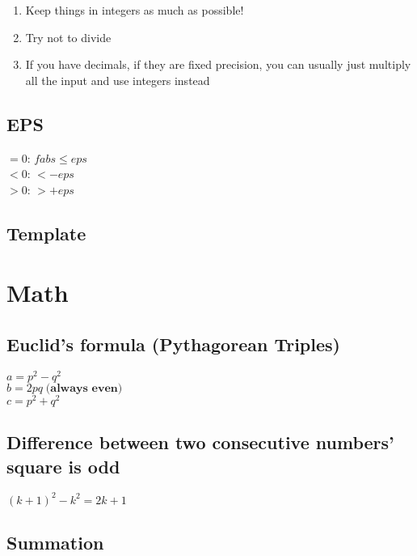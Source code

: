 \documentclass[10pt,oneside]{article}
\begin{document}
\begin{landscape}
\begin{multicols}{2}
\begin{enumerate}
	\item Keep things in integers as much as possible!
	\item Try not to divide
	\item If you have decimals, if they are fixed precision, you can usually just multiply all the input and use integers instead
\end{enumerate}

\subsection{EPS}


$=0$: $fabs \leq eps$\\
$<0$: $ < -eps$\\
$>0$: $ > +eps$

\subsection{Template}

% 


\section{Math}

\subsection{Euclid's formula (Pythagorean Triples)}

$a = p^2 - q^2 $\\
$b = 2pq \; \textbf{(always even)}$ \\
$c = p^2 + q^2$\\

\subsection{Difference between two consecutive numbers' square is odd}

$(k + 1)^2 - k^2 = 2k + 1$

\subsection{Summation}


\end{multicols}
\end{landscape}
\end{document}
